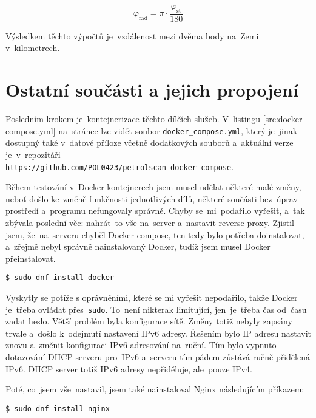 \begin{equation}
    \label{eq:deg-to-rad}
    \varphi_{\text{rad}} = \pi \cdot \frac{\varphi_{\text{st}}}{180}
\end{equation}

Výsledkem těchto výpočtů je~vzdálenost mezi dvěma body na~Zemi v~kilometrech.

\section{Ostatní součásti a jejich propojení}
\label{sec:other-parts-and-stitching-services-together}

Posledním krokem je~kontejnerizace těchto dílčích služeb. V~listingu
\ref{src:docker-compose.yml} na~stránce \pageref{src:docker-compose.yml}
lze vidět soubor \texttt{docker\_compose.yml}, který je~jinak dostupný
také v~datové příloze včetně dodatkových souborů a~aktuální verze
je~v~repozitáři\\
\texttt{https://github.com/POL0423/petrolscan-docker-compose}.

Během testování v~Docker kontejnerech jsem musel udělat některé malé
změny, neboť došlo ke~změně funkčnosti jednotlivých dílů, některé součásti
bez~úprav prostředí a~programu nefungovaly správně. Chyby se~mi~podařilo
vyřešit, a~tak zbývala poslední věc: nahrát~to vše na~server a~nastavit
reverse proxy. Zjistil jsem, že~na~serveru chyběl Docker compose,
ten tedy bylo potřeba doinstalovat, a~zřejmě nebyl správně nainstalovaný
Docker, tudíž jsem musel Docker přeinstalovat.

\begin{verbatim}
$ sudo dnf install docker
\end{verbatim}

Vyskytly se potíže s oprávněními, které se mi vyřešit nepodařilo,
takže Docker je~třeba ovládat přes~\texttt{sudo}. To~není nikterak
limitující, jen~je~třeba čas od~času zadat heslo. Větší problém byla
konfigurace sítě. Změny totiž nebyly zapsány trvale a~došlo k~odejmutí
nastavení IPv6 adresy. Řešením bylo IP adresu nastavit znovu a~změnit
konfiguraci IPv6 adresování na~ruční. Tím bylo vypnuto dotazování DHCP
serveru pro~IPv6 a~serveru tím pádem zůstává ručně přidělená IPv6.
DHCP server totiž IPv6 adresy nepřiděluje, ale~pouze IPv4.

Poté, co~jsem vše~nastavil, jsem také nainstaloval Nginx následujícím
příkazem:

\begin{verbatim}
$ sudo dnf install nginx
\end{verbatim}

